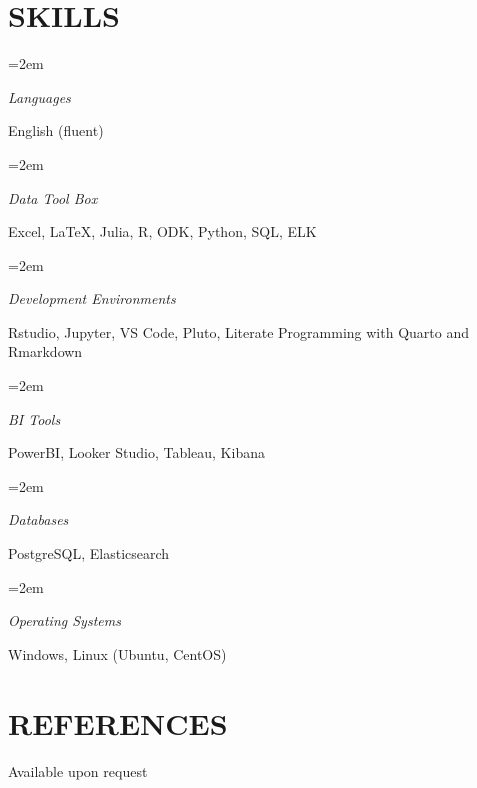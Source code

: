 \documentclass[paper=a4,fontsize=10pt]{scrartcl} %
\newlength{\spacebox}
\newcommand{\NewPart}[1]{\section*{\uppercase{#1}}}
\newcommand{\PersonalEntry}[2]{
        \noindent\hangindent=2em\hangafter=0 %
        \parbox{\spacebox}{        %
        \textit{#1}}               %
        \hspace{1.5em} #2 \par}    %
\newcommand{\SkillsEntry}[2]{      %
        \noindent\hangindent=2em\hangafter=0 %
        \parbox{\spacebox}{        %
        \textit{#1}}               %
        \hspace{1.5em} #2 \par}    %
\begin{document}
\NewPart{Skills}{}

\SkillsEntry{Languages}{English (fluent)}

\SkillsEntry{Data Tool Box}{Excel, \LaTeX, Julia, \textsc{R}, ODK, Python, SQL, ELK}

\SkillsEntry{Development Environments}{Rstudio, Jupyter, VS Code, Pluto, Literate Programming with Quarto and Rmarkdown}
\SkillsEntry{BI Tools}{PowerBI, Looker Studio, Tableau, Kibana}
\SkillsEntry{Databases}{ PostgreSQL, Elasticsearch}
\SkillsEntry{Operating Systems}{Windows, Linux (Ubuntu, CentOS)}



\NewPart{References}{}
Available upon request
\end{document}
